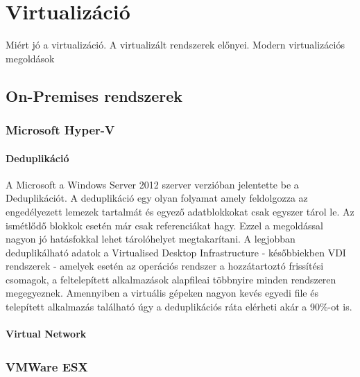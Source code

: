 \documentclass[12pt,oneside,justify]{book}
\begin{document}
 




\tableofcontents

\chapter{Virtualizáció}
\noindent Miért jó a virtualizáció. A virtualizált rendszerek előnyei. Modern virtualizációs megoldások

\section{On-Premises rendszerek}

\subsection{Microsoft Hyper-V\texttrademark}

\subsubsection{Deduplikáció}

\noindent A Microsoft a Windows Server 2012 szerver verzióban jelentette be a Deduplikációt. A deduplikáció egy olyan folyamat amely feldolgozza az engedélyezett lemezek tartalmát és egyező adatblokkokat csak egyszer tárol le. Az ismétlődő blokkok esetén már csak referenciákat hagy. Ezzel a megoldással nagyon jó hatásfokkal lehet tárolóhelyet megtakarítani. A legjobban deduplikálható adatok a Virtualised Desktop Infrastructure - későbbiekben VDI rendszerek - amelyek esetén az operációs rendszer a hozzátartoztó frissítési csomagok, a feltelepített alkalmazások alapfileai többnyire minden rendszeren megegyeznek. Amennyiben a virtuális gépeken nagyon kevés egyedi file és telepített alkalmazás található úgy a deduplikációs ráta elérheti akár a 90\%-ot is.


\subsubsection{Virtual Network}


\subsection{VMWare ESX \textsuperscript{\textregistered}}
\noindent
\end{document}
